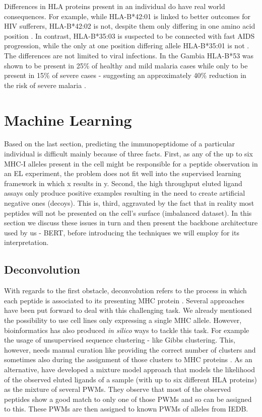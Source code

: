 \documentclass[msc,deptreport,ai]{infthesis} %
\begin{document}
		Differences in \gls{HLA} proteins present in an individual do have real world consequences. For example, while HLA-B*42:01 is linked to better outcomes for HIV sufferers, HLA-B*42:02 is not, despite them only differing in one amino acid position \cite{van_deutekom_zooming_2015}. In contrast, HLA-B*35:03 is suspected to be connected with fast AIDS progression, while the only at one position differing allele HLA-B*35:01 is not \cite{van_deutekom_zooming_2015}. The differences are not limited to viral infections. In the Gambia HLA-B*53 was shown to be present in 25\% of healthy and mild malaria cases while only to be present in 15\% of severe cases - suggesting an approximately 40\% reduction in the risk of severe malaria \cite{mosaad_clinical_2015}.

\section{Machine Learning}
	Based on the last section, predicting the immunopeptidome of a particular individual is difficult mainly because of three facts. First, as any of the up to six \gls{MHC-I} alleles present in the cell might be responsible for a peptide observation in an \gls{EL} experiment, the problem does not fit well into the supervised learning framework in which x results in y. Second, the high throughput eluted ligand assays only produce positive examples resulting in the need to create artificial negative ones (decoys). This is, third, aggravated by the fact that in reality most peptides will not be presented on the cell's surface (imbalanced dataset). In this section we discuss these issues in turn and then present the backbone architecture used by us  - \acrshort{BERT}, before introducing the techniques we will employ for its interpretation.
	
	\subsection{Deconvolution}
	\label{subsec:deconv}
		With regards to the first obstacle, deconvolution refers to the process in which each peptide is associated to its presenting \gls{MHC} protein \cite{alvarez_nnalign_ma_2019}. Several approaches have been put forward to deal with this challenging task. We already mentioned the possibility to use cell lines only expressing a single \gls{MHC} allele. However, bioinformatics has also produced \textit{in silico} ways to tackle this task. For example the usage of unsupervised sequence clustering - like Gibbs clustering. This, however, needs manual curation like providing the correct number of clusters and sometimes also during the assignment of those clusters to \gls{MHC} proteins \cite{alvarez_nnalign_ma_2019}. As an alternative, \cite{bassani-sternberg_unsupervised_2016} have developed a mixture model approach that models the likelihood of the observed eluted ligands of a sample (with up to six different \gls{HLA} proteins) as the mixture of several \glspl{PWM}. They observe that most of the observed peptides show a good match to only one of those \glspl{PWM} and so can be assigned to this. These \glspl{PWM} are then assigned to known \glspl{PWM} of alleles from IEDB. 
\end{document}
